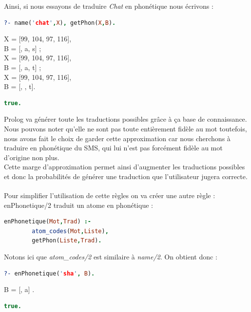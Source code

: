 \documentclass[11pt]{report}
\begin{document}
	Ainsi, si nous essayons de traduire {\em Chat} en phonétique nous écrivons :
	\begin{lstlisting}[language=Prolog]
	?- name('chat',X), getPhon(X,B).
	\end{lstlisting}
	\indent \indent \indent \indent X = [99, 104, 97, 116],\\
	\indent \indent \indent B = [, a, s] ;\\
	\indent \indent \indent X = [99, 104, 97, 116],\\
	\indent \indent \indent B = [, a, t] ;\\
	\indent \indent \indent X = [99, 104, 97, 116],\\
	\indent \indent \indent B = [, , t].\\
	\begin{lstlisting}[language=Prolog]
	true.
	\end{lstlisting}
	
	Prolog va générer toute les traductions possibles grâce à ça base de connaissance. Nous pouvons noter qu'elle ne sont pas toute entièrement fidèle au mot toutefois, nous avons fait le choix de garder cette approximation car nous cherchons à traduire en phonétique du SMS, qui lui n'est pas forcément fidèle au mot d'origine non plus.\\
	Cette marge d'approximation permet ainsi d'augmenter les traductions possibles et donc la probabilités de générer une traduction que l'utilisateur jugera correcte.
	\paragraph{}
	Pour simplifier l'utilisation de cette règles on va créer une autre règle :\\
	enPhonetique/2 traduit un atome en phonétique :
	\begin{lstlisting}[language=Prolog]
	enPhonetique(Mot,Trad) :-
		atom_codes(Mot,Liste),
		getPhon(Liste,Trad).
	\end{lstlisting}
	
	Notons ici que {\em atom\_codes/2} est similaire à {\em name/2}. On obtient donc :
	\begin{lstlisting}[language=Prolog]
	?- enPhonetique('sha', B).
	\end{lstlisting}
	\indent \indent \indent \indent  B = [, a] .
	\begin{lstlisting}[language=Prolog]
	true.
	\end{lstlisting}
	
\end{document}
